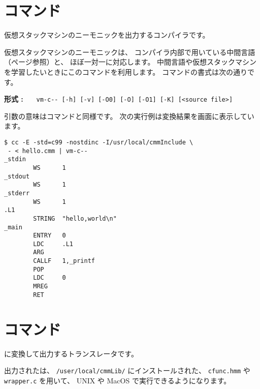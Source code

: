 %

\section{{\vcmmc}コマンド}

仮想スタックマシンのニーモニックを出力する{\cmm}コンパイラです。

仮想スタックマシンのニーモニックは、
コンパイラ内部で用いている中間言語（\pageref{app:vm}ページ参照）と、
ほぼ一対一に対応します。
中間言語や仮想スタックマシンを学習したいときにこのコマンドを利用します。
{\vcmmc}コマンドの書式は次の通りです。

\begin{flushleft}
{\bf 形式 : }~~~\verb/vm-c-- [-h] [-v] [-O0] [-O] [-O1] [-K] [<source file>]/
\end{flushleft}

引数の意味は{\cmmc}コマンドと同様です。
次の実行例は変換結果を画面に表示しています。

\begin{mylist}
\begin{verbatim}
$ cc -E -std=c99 -nostdinc -I/usr/local/cmmInclude \
 - < hello.cmm | vm-c--
_stdin
        WS      1
_stdout
        WS      1
_stderr
        WS      1
.L1
        STRING  "hello,world\n"
_main
        ENTRY   0
        LDC     .L1
        ARG
        CALLF   1,_printf
        POP
        LDC     0
        MREG
        RET
\end{verbatim}
\end{mylist}

\section{{\ccmmc}コマンド}

{\cl}に変換して出力するトランスレータです。

出力された{\cl}は、
\verb;/user/local/cmmLib/; にインストールされた、
\verb;cfunc.hmm; や \verb;wrapper.c; を用いて、
UNIX や MacOS で実行できるようになります。

